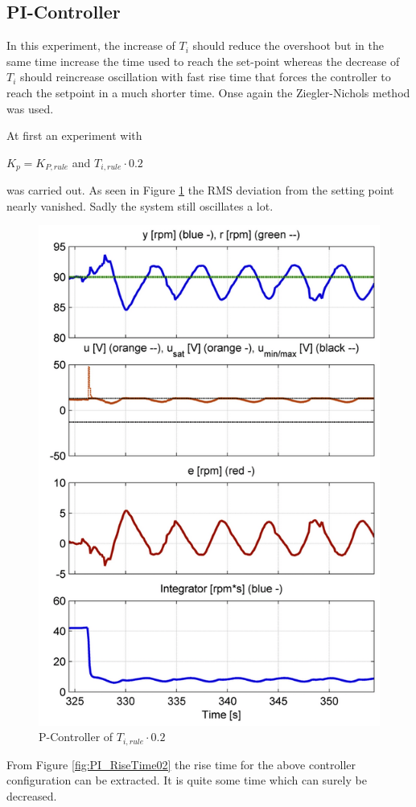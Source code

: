 \subsection{PI-Controller}

In this experiment, the increase of $T_{i}$ should reduce the overshoot but in the same time increase the time used to reach the set-point whereas the decrease of $ T_{i}$ should reincrease oscillation with fast rise time that forces the controller to reach the setpoint in a much shorter time.
Onse again the Ziegler-Nichols method was used.

At first an experiment with
\begin{center}
{$K_{p}= K_{P,rule}$ and $ T_{i,rule}\cdot0.2$}
\end{center}

was carried out. As seen in Figure \ref{fig:PI_Controller02} the RMS deviation from the setting point nearly vanished. Sadly the system still oscillates a lot.

\begin{figure}[H]
\begin{center}
\includegraphics[width=0.5\linewidth]{images/general/PI/PI_Controller02}
\end{center}
\caption{P-Controller of $ T_{i,rule}\cdot{0.2}$}
\label{fig:PI_Controller02}
\end{figure}


From Figure \ref{fig:PI_RiseTime02} the rise time for the above controller configuration can be extracted. It is quite some time which can surely be decreased.

